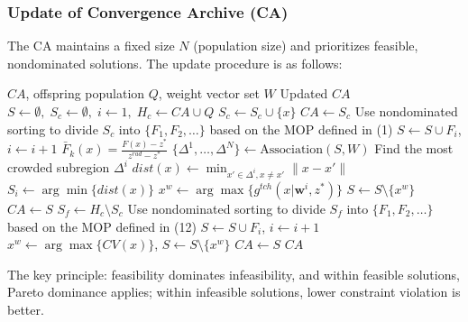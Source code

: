 \documentclass[12pt]{article}
\begin{document}
\subsubsection{Update of Convergence Archive (CA)}
The CA maintains a fixed size \(N\) (population size) and prioritizes feasible, nondominated solutions. The update procedure is as follows:
\begin{algorithm}
\caption{Update Mechanism of CA}
\label{alg:updateCA}
\begin{algorithmic}[1]
\Require $CA$, offspring population $Q$, weight vector set $W$
\Ensure Updated $CA$
\State $S \gets \emptyset,\; S_c \gets \emptyset,\; i \gets 1,\; H_c \gets CA \cup Q$
        \State $S_c \gets S_c \cup \{x\}$
    \EndIf
\EndFor
{}
    \State $CA \gets S_c$
    \State Use nondominated sorting to divide $S_c$ into $\{F_1, F_2, \dots\}$ based on the MOP defined in (1)
        \State $S \gets S \cup F_i$, $i \gets i+1$
    \EndWhile
            \State $\bar{F}_k(x) = \frac{F(x) - z^*}{z^{rad} - z^*}$
        \EndFor
        \State $\{\Delta^1, \dots, \Delta^N\} \gets \text{Association}(S, W)$
            \State Find the most crowded subregion $\Delta^i$
                \State $dist(x) \gets \min_{x' \in \Delta^i, x \neq x'} \|x - x'\|$
                \State $S_i \gets \arg\min\{dist(x)\}$
                \State $x^w \gets \arg\max\{g^{tch}(x|\mathbf{w}^i, z^*)\}$
                \State $S \gets S \setminus \{x^w\}$
            \EndFor
        \EndWhile
        \State $CA \gets S$
    \EndIf
\Else
    \State $S_f \gets H_c \setminus S_c$
    \State Use nondominated sorting to divide $S_f$ into $\{F_1, F_2, \dots\}$ based on the MOP defined in (12)
        \State $S \gets S \cup F_i$, $i \gets i+1$
    \EndWhile
        \State $x^w \gets \arg\max\{CV(x)\}$, $S \gets S \setminus \{x^w\}$
    \EndWhile
    \State $CA \gets S$
\EndIf
\State \Return $CA$
\end{algorithmic}
\end{algorithm}

The key principle: feasibility dominates infeasibility, and within feasible solutions, Pareto dominance applies; within infeasible solutions, lower constraint violation is better.

\newpage
\end{document}
